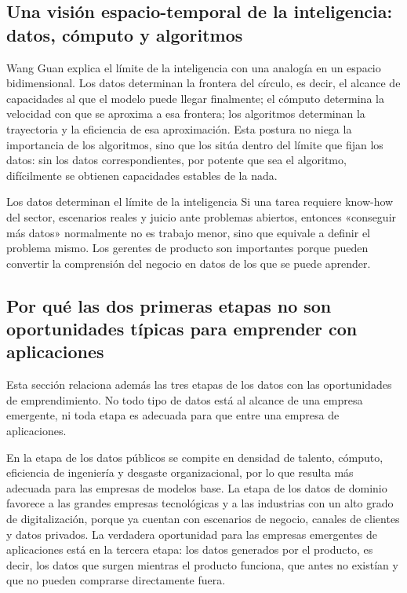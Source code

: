 \documentclass[a4paper]{article}
\begin{document}
\subsection{Una visión espacio-temporal de la inteligencia: datos, cómputo y algoritmos}

Wang Guan explica el límite de la inteligencia con una analogía en un espacio bidimensional. Los datos determinan la frontera del círculo, es decir, el alcance de capacidades al que el modelo puede llegar finalmente; el cómputo determina la velocidad con que se aproxima a esa frontera; los algoritmos determinan la trayectoria y la eficiencia de esa aproximación. Esta postura no niega la importancia de los algoritmos, sino que los sitúa dentro del límite que fijan los datos: sin los datos correspondientes, por potente que sea el algoritmo, difícilmente se obtienen capacidades estables de la nada.

\begin{importantbox}{Los datos determinan el límite de la inteligencia}
Si una tarea requiere know-how del sector, escenarios reales y juicio ante problemas abiertos, entonces «conseguir más datos» normalmente no es trabajo menor, sino que equivale a definir el problema mismo. Los gerentes de producto son importantes porque pueden convertir la comprensión del negocio en datos de los que se puede aprender.
\end{importantbox}

\subsection{Por qué las dos primeras etapas no son oportunidades típicas para emprender con aplicaciones}

Esta sección relaciona además las tres etapas de los datos con las oportunidades de emprendimiento. No todo tipo de datos está al alcance de una empresa emergente, ni toda etapa es adecuada para que entre una empresa de aplicaciones.

En la etapa de los datos públicos se compite en densidad de talento, cómputo, eficiencia de ingeniería y desgaste organizacional, por lo que resulta más adecuada para las empresas de modelos base. La etapa de los datos de dominio favorece a las grandes empresas tecnológicas y a las industrias con un alto grado de digitalización, porque ya cuentan con escenarios de negocio, canales de clientes y datos privados. La verdadera oportunidad para las empresas emergentes de aplicaciones está en la tercera etapa: los datos generados por el producto, es decir, los datos que surgen mientras el producto funciona, que antes no existían y que no pueden comprarse directamente fuera.
\end{document}
